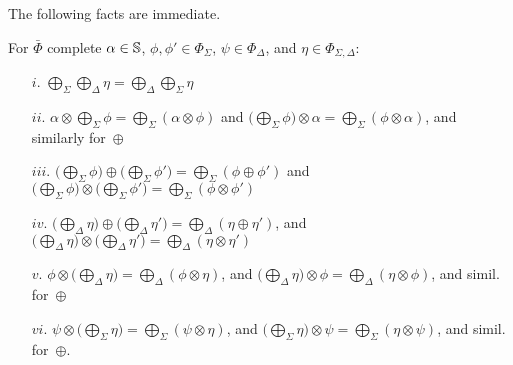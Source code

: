 \noindent 
The following facts are immediate.
%
\begin{lemma}
For $\bar\Phi$ complete %
$\alpha \in \mathbb{S}$,
$\phi, \phi' \in \Phi_{\Sigma}$,
$\psi \in \Phi_{\Delta}$, and
$\eta \in \Phi_{\Sigma, \Delta}$:
%
\begin{enumerate}
\item[$i.$]
\( \bigoplus_{\Sigma}\bigoplus_{\Delta} \eta = \bigoplus_{\Delta}\bigoplus_{\Sigma} \eta \)
\item[$ii.$] 
\( \alpha \otimes \bigoplus_{\Sigma} \phi = \bigoplus_{\Sigma} (\alpha \otimes \phi) \) and
\( \bigl( \bigoplus_{\Sigma} \phi \bigr) \otimes\alpha = \bigoplus_{\Sigma} (\phi \otimes \alpha) \),
and similarly for~$\oplus$
\item[$iii.$]
\( \bigl(\bigoplus_{\Sigma} \phi\bigr) \oplus \bigl(\bigoplus_{\Sigma} \phi'\bigr) 
   = \bigoplus_{\Sigma} (\phi \oplus \phi') \) and
\( \bigl(\bigoplus_{\Sigma} \phi\bigr) \otimes \bigl(\bigoplus_{\Sigma} \phi'\bigr) 
   = \bigoplus_{\Sigma} (\phi \otimes \phi') \)
\item[$iv.$] 
\( \bigl(\bigoplus_{\Delta} \eta\bigr) \oplus \bigl(\bigoplus_{\Delta} \eta' \bigr) = 
 \bigoplus_{\Delta} (\eta \oplus \eta') \), and
\( \bigl(\bigoplus_{\Delta} \eta\bigr) \otimes \bigl(\bigoplus_{\Delta} \eta' \bigr) = 
 \bigoplus_{\Delta} (\eta \otimes \eta') \)
\item[$v.$] 
\( \phi \otimes \bigl(\bigoplus_{\Delta} \eta\bigr) = \bigoplus_{\Delta} (\phi \otimes \eta) \), and
\( \bigl(\bigoplus_{\Delta} \eta\bigr) \otimes \phi = \bigoplus_{\Delta} (\eta \otimes \phi) \),
and simil. for~$\oplus$
\item[$vi.$] 
\( \psi \otimes \bigl(\bigoplus_{\Sigma} \eta\bigr) = \bigoplus_{\Sigma} (\psi \otimes \eta) \), and
\( \bigl(\bigoplus_{\Sigma} \eta\bigr) \otimes \psi = \bigoplus_{\Sigma} (\eta \otimes \psi) \),
and simil. for~$\oplus$.
\end{enumerate}
\end{lemma}


